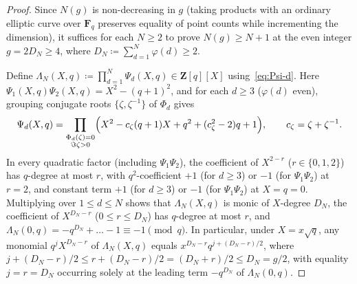 \documentclass[11pt]{amsart}
\theoremstyle{remark}
\newcommand{\F}{\mathbf{F}}
\newcommand{\Z}{\mathbf{Z}}
\begin{document}
\begin{proof}
Since $N(g)$ is non-decreasing in $g$ (taking products with an ordinary elliptic curve over $\F_q$ preserves equality of point counts while incrementing the dimension), it suffices for each $N \ge 2$ to prove $N(g) \ge N + 1$ at the even integer $g = 2 D_N \ge 4$, where $D_N \coloneqq \sum_{d=1}^N \varphi(d) \ge 2$.

Define $\Lambda_N(X, q) \coloneqq \prod_{d=1}^N \Psi_d(X, q) \in \Z[q][X]$ using~\eqref{eq:Psi-d}. Here $\Psi_1(X, q)\Psi_2(X, q) = X^2 - (q + 1)^2$, and for each $d \ge 3$ ($\varphi(d)$ even), grouping conjugate roots $\{\zeta, \zeta^{-1}\}$ of $\Phi_d$ gives
\[
\Psi_d(X, q) = \prod_{\substack{\Phi_d(\zeta) = 0 \\ \Im\zeta > 0}} \Bigl(X^2 - c_\zeta(q + 1) X + q^2 + (c_\zeta^2 - 2)q + 1\Bigr), \qquad c_\zeta = \zeta + \zeta^{-1}.
\]
In every quadratic factor (including $\Psi_1\Psi_2$), the coefficient of $X^{2 - r}$ ($r \in \{0, 1, 2\}$) has $q$-degree at most $r$, with $q^2$-coefficient $+1$ (for $d \ge 3$) or $-1$ (for $\Psi_1\Psi_2$) at $r = 2$, and constant term $+1$ (for $d \ge 3$) or $-1$ (for $\Psi_1\Psi_2$) at $X = q = 0$. Multiplying over $1 \le d \le N$ shows that $\Lambda_N(X, q)$ is monic of $X$-degree $D_N$, the coefficient of $X^{D_N - r}$ ($0 \le r \le D_N$) has $q$-degree at most $r$, and $\Lambda_N(0, q) = -q^{D_N} + \dots - 1 \equiv -1 \pmod{q}$. In particular, under $X = x\sqrt{q}$, any monomial $q^j X^{D_N - r}$ of $\Lambda_N(X, q)$ equals $x^{D_N - r} q^{j + (D_N - r)/2}$, where $j + (D_N - r)/2 \le r + (D_N - r)/2 = (D_N + r)/2 \le D_N = g/2$, with equality $j = r = D_N$ occurring solely at the leading term $-q^{D_N}$ of $\Lambda_N(0, q)$.


\end{proof}
\end{document}

